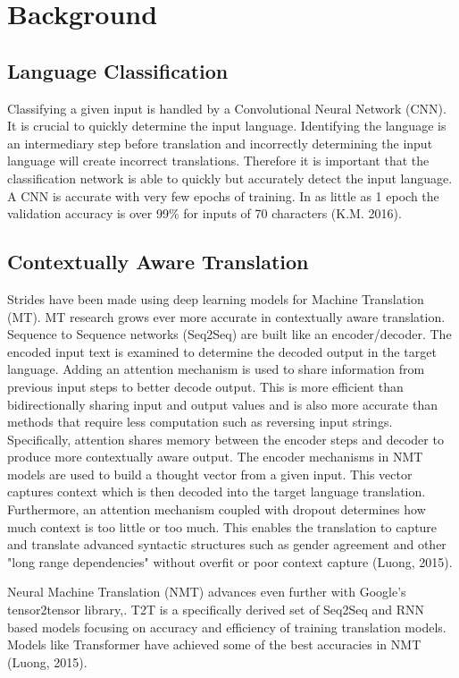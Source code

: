 \documentclass[10pt,a4paper]{article}
\begin{document}
\section{Background}


\subsection{Language Classification}


Classifying a given input is handled by a Convolutional Neural Network (CNN). It is crucial to quickly determine the input language. Identifying the language is an intermediary step before translation and incorrectly determining the input language will create incorrect translations. Therefore it is important that the classification network is able to quickly but accurately detect the input language. A CNN is accurate with very few epochs of training. In as little as 1 epoch the validation accuracy is over 99\% for inputs of 70 characters (K.M. 2016).


\subsection{Contextually Aware Translation}


Strides have been made using deep learning models for Machine Translation (MT).  MT research grows ever more accurate in contextually aware translation. Sequence to Sequence networks (Seq2Seq) are built like an encoder/decoder. The encoded input text is examined to determine the decoded output in the target language. Adding an attention mechanism is used to share information from previous input steps to better decode output. This is more efficient than bidirectionally sharing input and output values and is also more accurate than methods that require less computation such as reversing input strings. Specifically, attention shares memory between the encoder steps and decoder to produce more contextually aware output. The encoder mechanisms in NMT models are used to build a thought vector from a given input. This vector captures context which is then decoded into the target language translation. Furthermore, an attention mechanism coupled with dropout determines how much context is too little or too much. This enables the translation to capture and translate advanced syntactic structures such as gender agreement and other "long range dependencies" without overfit or poor context capture (Luong, 2015).


Neural Machine Translation (NMT) advances even further with Google's tensor2tensor library,. T2T is a specifically derived set of Seq2Seq and RNN based models focusing on accuracy and efficiency of training translation models. Models like Transformer have achieved some of the best accuracies in NMT (Luong, 2015).
  
\end{document}
